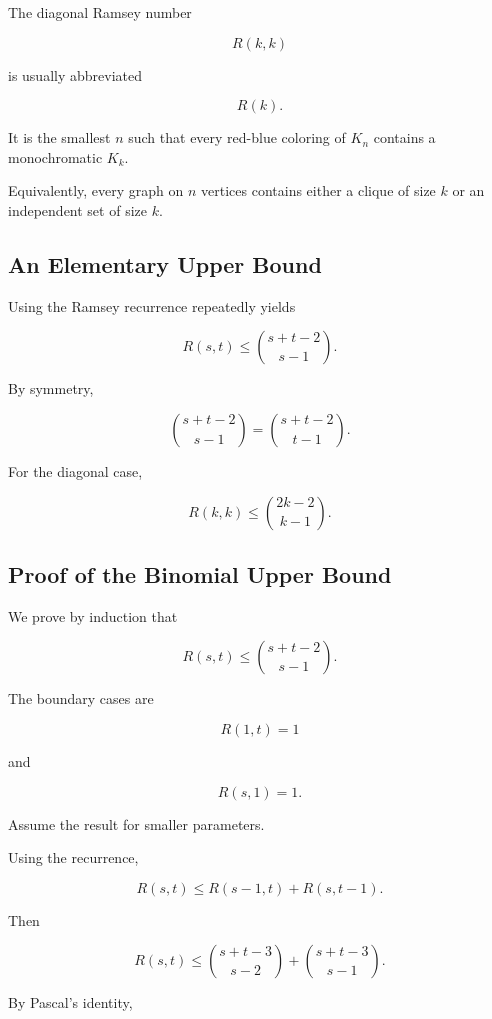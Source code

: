 The diagonal Ramsey number

\[
R(k,k)
\]

is usually abbreviated

\[
\boxed{
R(k).
}
\]

It is the smallest \(n\) such that every red-blue coloring of \(K_n\)
contains a monochromatic \(K_k\).

Equivalently, every graph on \(n\) vertices contains either a clique of
size \(k\) or an independent set of size \(k\).

\subsection{An Elementary Upper Bound}
\label{subsec:elementary-ramsey-upper}

Using the Ramsey recurrence repeatedly yields

\[
\boxed{
R(s,t)
\leq
\binom{s+t-2}{s-1}.
}
\]

By symmetry,

\[
\binom{s+t-2}{s-1}
=
\binom{s+t-2}{t-1}.
\]

For the diagonal case,

\[
\boxed{
R(k,k)
\leq
\binom{2k-2}{k-1}.
}
\]

\subsection{Proof of the Binomial Upper Bound}
\label{subsec:proof-binomial-ramsey-upper}

We prove by induction that

\[
R(s,t)
\leq
\binom{s+t-2}{s-1}.
\]

The boundary cases are

\[
R(1,t)=1
\]

and

\[
R(s,1)=1.
\]

Assume the result for smaller parameters.

Using the recurrence,

\[
R(s,t)
\leq
R(s-1,t)+R(s,t-1).
\]

Then

\[
R(s,t)
\leq
\binom{s+t-3}{s-2}
+
\binom{s+t-3}{s-1}.
\]

By Pascal's identity,

